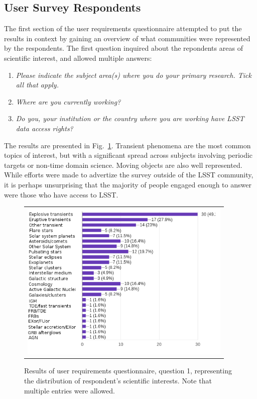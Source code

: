\documentclass{article}
\begin{document}
\subsection{User Survey Respondents}
The first section of the user requirements questionnaire attempted to put the results in context by gaining an overview of what communities were represented by the respondents.  The first question inquired about the repondents areas of scientific interest, and allowed multiple answers:

\begin{enumerate}
\item {\em Please indicate the subject area(s) where you do your primary research.  Tick all that apply.}
\setcounter{enumi}{5}
\item {\em Where are you currently working?}
\item {\em Do you, your institution or the country where you are working have LSST data access rights?}
\end{enumerate}

The results are presented in Fig.~\ref{fig:Q1results}.  Transient phenomena are the most common topics of interest, but with a significant spread across subjects involving periodic targets or non-time domain science.  Moving objects are also well represented.  While efforts were made to advertize the survey outside of the LSST community, it is perhaps unsurprising that the majority of people engaged enough to answer were those who have access to LSST.  

\begin{figure}[ht]
\centering
\begin{tabular}{c}
\includegraphics[width=4in]{figures/user_question_1.png}
\end{tabular}
\caption{Results of user requirements questionnaire, question 1, representing the distribution of respondent's scientific interests.  Note that multiple entries were allowed. \label{fig:Q1results}}
\end{figure}
\end{document}
